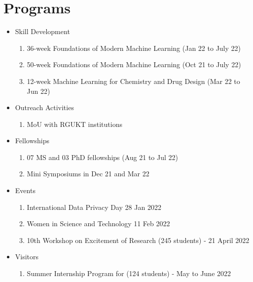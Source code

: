 \titleframe



\section{Programs}
\begin{frame}
  \begin{itemize}
    \item Skill Development
         \begin{enumerate}
        \item 36-week Foundations of Modern Machine Learning (Jan 22 to July 22) 
        \item 50-week Foundations of Modern Machine Learning (Oct 21  to July 22)
        \item 12-week Machine Learning for Chemistry and Drug Design (Mar 22 to Jun 22)
     \end{enumerate}
    \item Outreach Activities
     \begin{enumerate}
        \item MoU with RGUKT institutions
     \end{enumerate}
    \item Fellowships
     \begin {enumerate}
        \item 07 MS and 03 PhD fellowships (Aug 21 to Jul 22)
       \item Mini Symposiums in Dec 21 and Mar 22
     \end{enumerate}
    \item Events
     \begin{enumerate}
       \item International Data Privacy Day 28 Jan 2022
      \item Women in Science and Technology 11 Feb 2022
      \item 10th Workshop on Excitement of Research (245 students) - 21 April 2022
     \end{enumerate}
    \item Visitors
      \begin{enumerate}
         \item Summer Internship Program for (124 students) - May to June 2022
      \end{enumerate}
  \end{itemize}

\end{frame}
